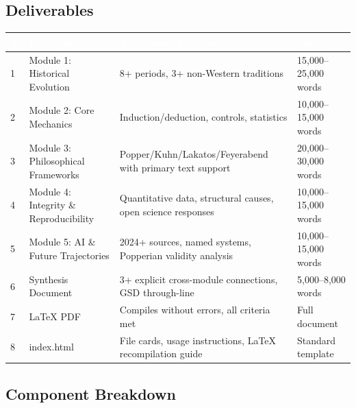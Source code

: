 \documentclass[11pt,letterpaper]{article}
\newcommand{\tableheader}[1]{\textbf{\sffamily\textcolor{white}{#1}}}
\begin{document}
\subsection{Deliverables}

\begin{center}
\begin{tabularx}{\textwidth}{C{0.5cm}L{4cm}L{4cm}X}
\toprule
{}
\tableheader{\#} & \tableheader{Deliverable} & \tableheader{Acceptance Criteria} & \tableheader{Spec} \\
 & Module 1: Historical Evolution & 8+ periods, 3+ non-Western traditions & 15,000--25,000 words \\
2 & Module 2: Core Mechanics & Induction/deduction, controls, statistics & 10,000--15,000 words \\
3 & Module 3: Philosophical Frameworks & Popper/Kuhn/Lakatos/Feyerabend with primary text support & 20,000--30,000 words \\
4 & Module 4: Integrity \& Reproducibility & Quantitative data, structural causes, open science responses & 10,000--15,000 words \\
5 & Module 5: AI \& Future Trajectories & 2024+ sources, named systems, Popperian validity analysis & 10,000--15,000 words \\
6 & Synthesis Document & 3+ explicit cross-module connections, GSD through-line & 5,000--8,000 words \\
7 & LaTeX PDF & Compiles without errors, all criteria met & Full document \\
8 & index.html & File cards, usage instructions, LaTeX recompilation guide & Standard template \\
\bottomrule
\end{tabularx}
\end{center}

\subsection{Component Breakdown}
\end{document}
